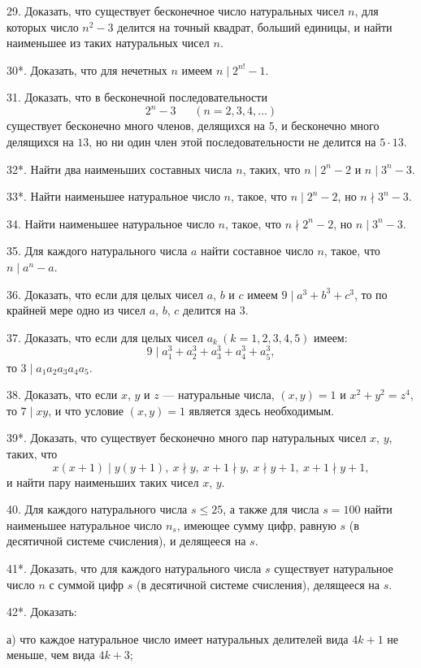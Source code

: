 \documentclass[12pt, a4paper, openany]{book}
\begin{document}
29. Доказать, что существует бесконечное число натуральных чисел $n$, для которых число $n^2-3$ делится на точный квадрат, больший единицы, и найти наименьшее из таких натуральных чисел $n$.

30*. Доказать, что для нечетных $n$ имеем $n \mid 2^{n!}-1$.

31. Доказать, что в бесконечной последовательности
		$$
		2^n-3 \ \ \ \ \ \ \	(n = 2,3,4, . . .)
		$$
		существует бесконечно много членов, делящихся на $5$, и бесконечно много делящихся на $13$, но ни один член этой последовательности не делится на $5 \cdot 13$.

32*. Найти два наименьших составных числа $n$, таких, что $n \mid 2^n-2$ и $n \mid 3^n-3$.

33*. Найти наименьшее натуральное число $n$, такое, что $n \mid 2^n-2$, но $n \nmid 3^n-3$.

34. Найти наименьшее натуральное число $n$, такое, что $n \nmid 2^n-2$, но $n \mid 3^n-3$.

35. Для каждого натурального числа $a$ найти составное число $n$, такое, что $n \mid a^n - a$.

36. Доказать, что если для целых чисел $a$, $b$ и $c$ имеем $9 \mid a^3 + b^3 + c^3$, то по крайней мере одно из чисел $a$, $b$, $c$ делится на 3.

37. Доказать, что если для целых чисел $a_k \ (k =1, 2, 3, 4, 5)$ имеем:
	$$
	9 \mid a_1^3 + a_2^3 + a_3^3 + a_4^3 + a_5^3 ,
	$$
	то $3 \mid a_1a_2a_3a_4a_5$.

38. Доказать, что если $x$, $y$ и $z$ — натуральные числа, $(x,y) = 1$ и $x^2+y^2=z^4$, то $7 \mid xy$, и что условие $(x,y)=1$ является здесь необходимым.
	
39*. Доказать, что существует бесконечно много пар натуральных	чисел $x$, $y$, таких, что 
	$$
	x(x+1) \mid y(y+1),\ x \nmid y,\ x+1 \nmid y,\ x \nmid y+1,\ x+1 \nmid y+1,
	$$
	и найти пару наименьших таких чисел $x$, $y$.
	
40. Для каждого натурального числа $s \leqslant 25$, а также для числа $s = 100$ найти наименьшее натуральное число $n_s$, имеющее сумму цифр, равную $s$ (в десятичной системе счисления), и делящееся на $s$.

41*. Доказать, что для каждого натурального числа $s$ существует натуральное число $n$ с суммой цифр $s$ (в десятичной системе счисления), делящееся на $s$.

42*. Доказать:

	а)	что каждое натуральное число имеет натуральных делителей вида $4k+1$ не меньше, чем вида $4k+3$;
\end{document}
